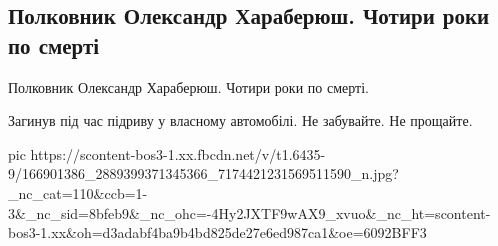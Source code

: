  
 
 
 
 

\subsection{Полковник Олександр Хараберюш. Чотири роки по смерті}
\label{sec:31_03_2021.fb.makarenko_oksana.1.haraberjush_oleksandr}

Полковник Олександр Хараберюш.  Чотири роки по смерті.

Загинув під час підриву у власному автомобілі.
Не забувайте. Не прощайте.

\ifcmt
  pic https://scontent-bos3-1.xx.fbcdn.net/v/t1.6435-9/166901386_2889399371345366_7174421231569511590_n.jpg?_nc_cat=110&ccb=1-3&_nc_sid=8bfeb9&_nc_ohc=-4Hy2JXTF9wAX9_xvuo&_nc_ht=scontent-bos3-1.xx&oh=d3adabf4ba9b4bd825de27e6ed987ca1&oe=6092BFF3
\fi

